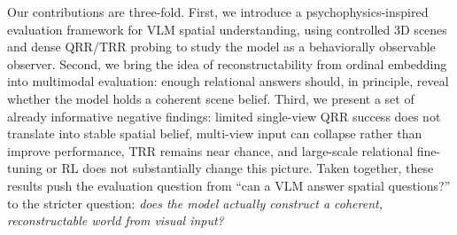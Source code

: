 Our contributions are three-fold. First, we introduce a psychophysics-inspired evaluation framework for VLM spatial understanding, using controlled 3D scenes and dense QRR/TRR probing to study the model as a behaviorally observable observer. Second, we bring the idea of reconstructability from ordinal embedding into multimodal evaluation: enough relational answers should, in principle, reveal whether the model holds a coherent scene belief. Third, we present a set of already informative negative findings: limited single-view QRR success does not translate into stable spatial belief, multi-view input can collapse rather than improve performance, TRR remains near chance, and large-scale relational fine-tuning or RL does not substantially change this picture. Taken together, these results push the evaluation question from ``can a VLM answer spatial questions?'' to the stricter question: \emph{does the model actually construct a coherent, reconstructable world from visual input?}
